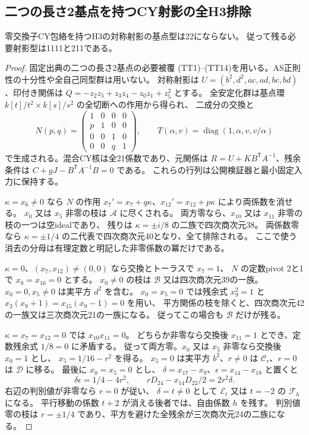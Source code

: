 \subsection{二つの長さ2基点を持つCY射影の全H3排除}
\label{subsec:cubic-CY-finite22-cover}
\begin{theorem}\label{thm:cubic-CY-finite22-empty}
零交換子CY包絡を持つH3の対称射影の基点型は22にならない。
従って残る必要射影型は1111と211である。
\end{theorem}
\begin{proof}
固定出典\cite{AS4CYpinned}の二つの長さ2基点の必要被覆
(TT1)--(TT14)を用いる。AS正則性の十分性や全自己同型群は用いない。
対称射影は $U=(b^2,d^2,ac,ad,bc,bd)$、印付き関係は
$Q=-z_2z_5+z_3z_4-z_0z_1+z_5^2$ とする。
全安定化群は基点環 $k[t]/t^2\times k[s]/s^2$ の全切断への作用から得られ、
二成分の交換と
\[
 N(p,q)=\begin{pmatrix}1&0&0&0\\p&1&0&0\\0&0&1&0\\0&0&q&1\end{pmatrix},\qquad
 T(\alpha,v)=\operatorname{diag}(1,\alpha,v,v/\alpha)
\]
で生成される。混合CY核は全21係数であり、元関係は
$R=U+KB^{\mathsf T}A^{-1}$、残余条件は
$C+gJ-B^{\mathsf T}A^{-1}B=0$ である。
これらの行列は公開検証器と最小固定入力に保持する。

$\kappa=x_6\ne0$ なら $N$ の作用
$x_7'=x_7+q\kappa$、$x_{12}'=x_{12}+p\kappa$ により両係数を消せる。
$x_0$ 又は $x_5$ 非零の枝は $\mathcal A$ に尽くされる。
両方零なら、$x_{10}$ 又は $x_{11}$ 非零の枝の一つは空idealであり、
残りは $\kappa=\pm i/8$ の二族で四次商次元38。
両係数零なら $\kappa=\pm1/4$ の二代表で四次商次元40となり、全て排除される。
ここで使う消去の分母は有理定数と明記した非零係数の冪だけである。

$\kappa=0$、$(x_7,x_{12})\ne(0,0)$ なら交換とトーラスで $x_7=1$、
$N$ の定数pivot 2と1で $x_8=x_{16}=0$ とする。
$x_0\ne0$ の枝は $\mathcal B$ 又は四次商次元39の一族。
$x_0=0,x_5\ne0$ は実平方 $d^2$ を含む。
$x_0=x_5=0$ では残余式 $x_9^2=1$ と
$x_2(x_9+1)=x_{15}(x_9-1)=0$ を用い、
平方関係の枝を除くと、四次商次元42の一族又は三次商次元21の一族になる。
従ってこの場合も $\mathcal B$ だけが残る。

$\kappa=x_7=x_{12}=0$ では $x_{10}x_{11}=0$。
どちらか非零なら交換後 $x_{11}=1$ とでき、定数残余式 $1/8=0$ に矛盾する。
従って両方零。$x_0$ 又は $x_5$ 非零なら交換後 $x_0=1$ とし、
$x_5=1/16-r^2$ を得る。
$x_5=0$ は実平方 $b^2$、$r\ne0$ は $\mathcal C_r$、$r=0$ は $\mathcal D$ に移る。
最後に $x_0=x_5=0$ とし、
$\delta=x_{17}-x_9$、$\epsilon=x_{14}-x_{18}$ と置くと
\[
 \delta\epsilon=1/4-4r^2,\qquad
 rD_{24}-x_{14}D_{22}/2=2r^2\delta.
\]
右辺の判別値が非零なら $r=0$ が従い、
$\delta=t\ne0$ として $\mathcal E_t$ 又は $t=-2$ の $\mathcal F_h$ になる。
平行移動の係数 $t+2$ が消える後者では、自由係数 $h$ を残す。
判別値零の枝は $r=\pm1/4$ であり、平方を避けた全残余が三次商次元24の二族になる。


\end{proof}
